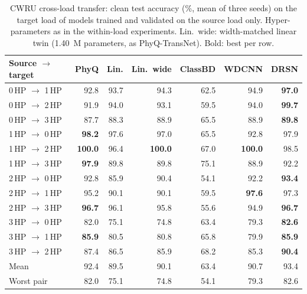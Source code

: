 \begin{table}[t]
\caption{CWRU cross-load transfer: clean test accuracy (\%, mean of three seeds) on the target load of models trained and validated on the source load only. Hyper-parameters as in the within-load experiments. Lin.\ wide: width-matched linear twin (1.40~M parameters, as PhyQ-TransNet). Bold: best per row.}\label{tab:crossload}
\centering\small
\begin{tabular}{lrrrrrr}
\toprule
Source $\rightarrow$ target & PhyQ & Lin. & Lin.\ wide & ClassBD & WDCNN & DRSN \\
\midrule
0\,HP $\rightarrow$ 1\,HP & 92.8 & 93.7 & 94.3 & 62.5 & 94.9 & \textbf{97.0} \\
0\,HP $\rightarrow$ 2\,HP & 91.9 & 94.0 & 93.1 & 59.5 & 94.0 & \textbf{99.7} \\
0\,HP $\rightarrow$ 3\,HP & 87.7 & 88.3 & 88.9 & 65.5 & 88.9 & \textbf{89.8} \\
1\,HP $\rightarrow$ 0\,HP & \textbf{98.2} & 97.6 & 97.0 & 65.5 & 92.8 & 97.9 \\
1\,HP $\rightarrow$ 2\,HP & \textbf{100.0} & 96.4 & \textbf{100.0} & 67.0 & \textbf{100.0} & 98.5 \\
1\,HP $\rightarrow$ 3\,HP & \textbf{97.9} & 89.8 & 89.8 & 75.1 & 88.9 & 92.2 \\
2\,HP $\rightarrow$ 0\,HP & 92.8 & 85.9 & 90.4 & 54.1 & 92.2 & \textbf{93.4} \\
2\,HP $\rightarrow$ 1\,HP & 95.2 & 90.1 & 90.1 & 59.5 & \textbf{97.6} & 97.3 \\
2\,HP $\rightarrow$ 3\,HP & \textbf{96.7} & 96.1 & 95.8 & 55.6 & 94.9 & \textbf{96.7} \\
3\,HP $\rightarrow$ 0\,HP & 82.0 & 75.1 & 74.8 & 63.4 & 79.3 & \textbf{82.6} \\
3\,HP $\rightarrow$ 1\,HP & \textbf{85.9} & 80.5 & 80.8 & 65.8 & 79.9 & \textbf{85.9} \\
3\,HP $\rightarrow$ 2\,HP & 87.4 & 86.5 & 85.9 & 68.2 & 85.3 & \textbf{90.4} \\
\midrule
Mean & 92.4 & 89.5 & 90.1 & 63.4 & 90.7 & 93.4 \\
Worst pair & 82.0 & 75.1 & 74.8 & 54.1 & 79.3 & 82.6 \\
\bottomrule
\end{tabular}
\end{table}
